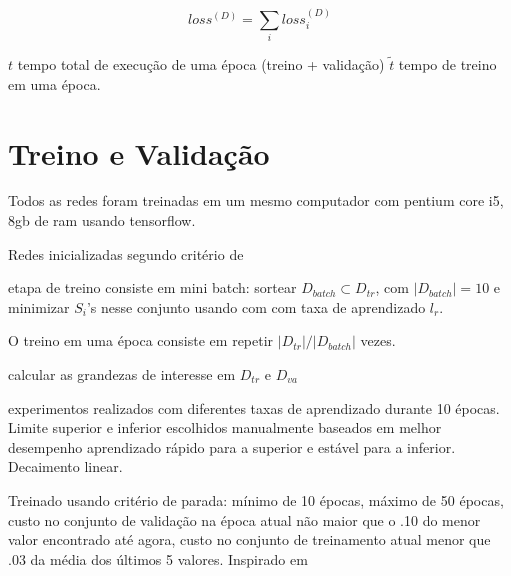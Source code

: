 \begin{equation}
loss^{(D)} = \sum_{i} loss_i^{(D)}
\end{equation}

$t$ tempo total de execução de uma época (treino + validação)
$\tilde{t}$ tempo de treino em uma época.

\section{Treino e Validação}

Todos as redes foram treinadas em um mesmo computador com pentium core i5, 8gb de ram usando tensorflow.

Redes inicializadas segundo critério de \cite{xavier_init}

etapa de treino consiste em
mini batch: sortear $D_{batch} \subset  D_{tr}$, com $|D_{batch}| = 10$ e minimizar  $S_i$'s nesse conjunto usando com \cite{adam_op} com taxa de aprendizado $l_r$. 

O treino em uma época consiste em repetir $|D_{tr}|/|D_{batch}|$ vezes.

calcular as grandezas de interesse em $D_{tr}$ e $D_{va}$


experimentos realizados com diferentes taxas de aprendizado durante 10 épocas. Limite superior e inferior escolhidos manualmente baseados em melhor desempenho aprendizado rápido para a superior e estável para a inferior. Decaimento linear.

Treinado usando critério de parada: mínimo de 10 épocas, máximo de 50 épocas, custo no conjunto de validação na época atual não maior que o .10 do menor valor encontrado até agora, custo no conjunto de treinamento atual menor que .03 da média dos últimos 5 valores. Inspirado em \cite{lutz_early_stop}
